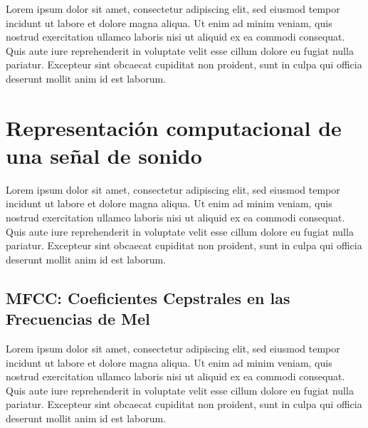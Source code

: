 Lorem ipsum dolor sit amet, consectetur adipiscing elit, sed eiusmod tempor incidunt ut labore et dolore magna aliqua.
Ut enim ad minim veniam, quis nostrud exercitation ullamco laboris nisi ut aliquid ex ea commodi consequat.
Quis aute iure reprehenderit in voluptate velit esse cillum dolore eu fugiat nulla pariatur.
Excepteur sint obcaecat cupiditat non proident, sunt in culpa qui officia deserunt mollit anim id est laborum.


\section{Representación computacional de una señal de sonido}\label{sec:features}

Lorem ipsum dolor sit amet, consectetur adipiscing elit, sed eiusmod tempor incidunt ut labore et dolore magna aliqua.
Ut enim ad minim veniam, quis nostrud exercitation ullamco laboris nisi ut aliquid ex ea commodi consequat.
Quis aute iure reprehenderit in voluptate velit esse cillum dolore eu fugiat nulla pariatur.
Excepteur sint obcaecat cupiditat non proident, sunt in culpa qui officia deserunt mollit anim id est laborum.

\subsection{MFCC: Coeficientes Cepstrales en las Frecuencias de Mel}\label{subsec:MFCC}

Lorem ipsum dolor sit amet, consectetur adipiscing elit, sed eiusmod tempor incidunt ut labore et dolore magna aliqua.
Ut enim ad minim veniam, quis nostrud exercitation ullamco laboris nisi ut aliquid ex ea commodi consequat.
Quis aute iure reprehenderit in voluptate velit esse cillum dolore eu fugiat nulla pariatur.
Excepteur sint obcaecat cupiditat non proident, sunt in culpa qui officia deserunt mollit anim id est laborum.
